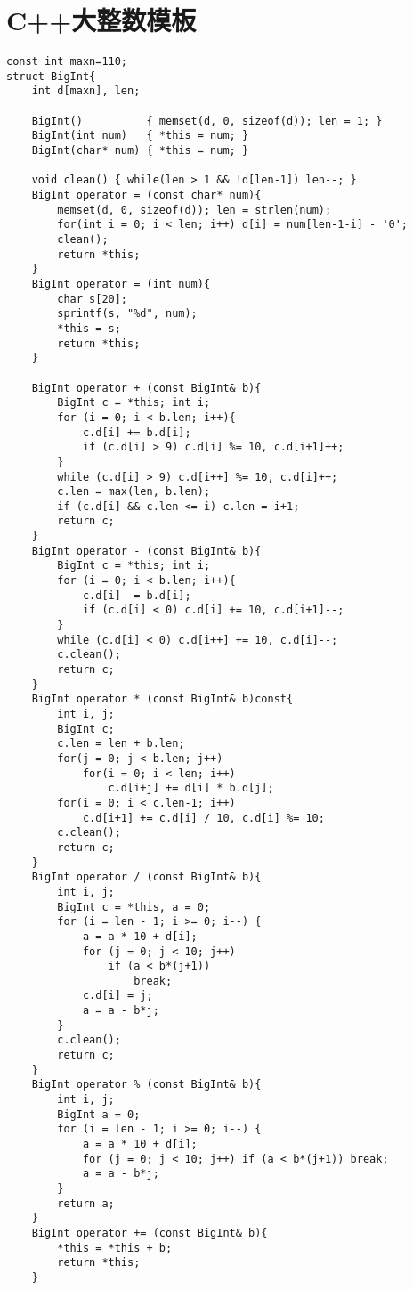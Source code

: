 \section{C++大整数模板}
\begin{verbatim}
const int maxn=110;
struct BigInt{
    int d[maxn], len;
 
    BigInt()          { memset(d, 0, sizeof(d)); len = 1; }
    BigInt(int num)   { *this = num; } 
    BigInt(char* num) { *this = num; }

    void clean() { while(len > 1 && !d[len-1]) len--; }
    BigInt operator = (const char* num){
        memset(d, 0, sizeof(d)); len = strlen(num);
        for(int i = 0; i < len; i++) d[i] = num[len-1-i] - '0';
        clean();
        return *this;
    }
    BigInt operator = (int num){
        char s[20];
        sprintf(s, "%d", num);
        *this = s;
        return *this;
    }
 
    BigInt operator + (const BigInt& b){
        BigInt c = *this; int i;
        for (i = 0; i < b.len; i++){
            c.d[i] += b.d[i];
            if (c.d[i] > 9) c.d[i] %= 10, c.d[i+1]++;
        }
        while (c.d[i] > 9) c.d[i++] %= 10, c.d[i]++;
        c.len = max(len, b.len);
        if (c.d[i] && c.len <= i) c.len = i+1;
        return c;
    }
    BigInt operator - (const BigInt& b){
        BigInt c = *this; int i;
        for (i = 0; i < b.len; i++){
            c.d[i] -= b.d[i];
            if (c.d[i] < 0) c.d[i] += 10, c.d[i+1]--;
        }
        while (c.d[i] < 0) c.d[i++] += 10, c.d[i]--;
        c.clean();
        return c;
    }
    BigInt operator * (const BigInt& b)const{
        int i, j; 
        BigInt c;
        c.len = len + b.len; 
        for(j = 0; j < b.len; j++)
            for(i = 0; i < len; i++) 
                c.d[i+j] += d[i] * b.d[j];
        for(i = 0; i < c.len-1; i++)
            c.d[i+1] += c.d[i] / 10, c.d[i] %= 10;
        c.clean();
        return c;
    }
    BigInt operator / (const BigInt& b){
        int i, j;
        BigInt c = *this, a = 0;
        for (i = len - 1; i >= 0; i--) {
            a = a * 10 + d[i];
            for (j = 0; j < 10; j++)
                if (a < b*(j+1))
                    break;
            c.d[i] = j;
            a = a - b*j;
        }
        c.clean();
        return c;
    }
    BigInt operator % (const BigInt& b){
        int i, j;
        BigInt a = 0;
        for (i = len - 1; i >= 0; i--) {
            a = a * 10 + d[i];
            for (j = 0; j < 10; j++) if (a < b*(j+1)) break;
            a = a - b*j;
        }
        return a;
    }
    BigInt operator += (const BigInt& b){
        *this = *this + b;
        return *this;
    }
 

\end{verbatim}
